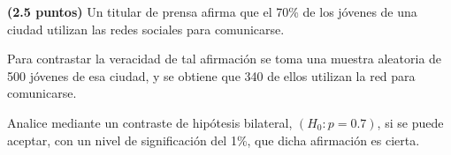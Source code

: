 
\textbf{(2.5 puntos)} Un titular de prensa afirma que el 70\% de los jóvenes de una ciudad utilizan las redes sociales para comunicarse.

Para contrastar la veracidad de tal afirmación se toma una muestra aleatoria de 500 jóvenes de esa ciudad, y se obtiene que 340 de ellos utilizan la red para comunicarse.

Analice mediante un contraste de hipótesis bilateral, $(H_0:p=0.7)$, si se puede aceptar, con un nivel de significación del 1\%, que dicha afirmación es cierta.
